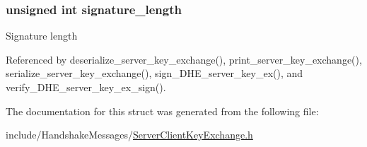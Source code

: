 \subsubsection[{\texorpdfstring{signature\+\_\+length}{signature_length}}]{\setlength{\rightskip}{0pt plus 5cm}unsigned int signature\+\_\+length}\hypertarget{structdhe__server__key__exchange__t_a23a683d5129246d9adbd0029612d06a8}{}\label{structdhe__server__key__exchange__t_a23a683d5129246d9adbd0029612d06a8}
Signature length 

Referenced by deserialize\+\_\+server\+\_\+key\+\_\+exchange(), print\+\_\+server\+\_\+key\+\_\+exchange(), serialize\+\_\+server\+\_\+key\+\_\+exchange(), sign\+\_\+\+D\+H\+E\+\_\+server\+\_\+key\+\_\+ex(), and verify\+\_\+\+D\+H\+E\+\_\+server\+\_\+key\+\_\+ex\+\_\+sign().



The documentation for this struct was generated from the following file\+:\begin{DoxyCompactItemize}
\item 
include/\+Handshake\+Messages/\hyperlink{_server_client_key_exchange_8h}{Server\+Client\+Key\+Exchange.\+h}\end{DoxyCompactItemize}
